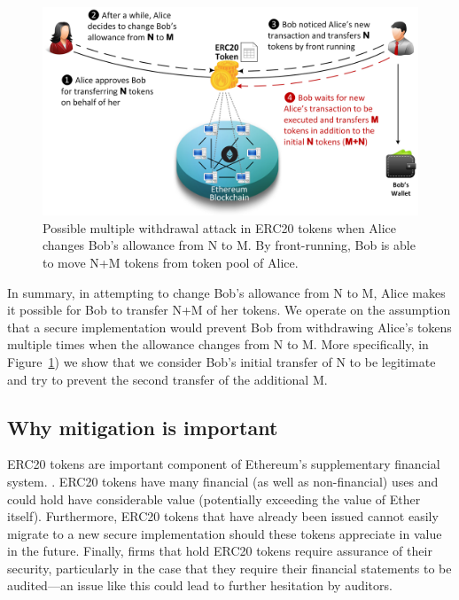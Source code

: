 \begin{figure}[ht]
	\centering
	\includegraphics[width=1.0\linewidth]{figures/multiple_withdrawal_02.png}
	\caption{Possible multiple withdrawal attack in ERC20 tokens when Alice changes Bob's allowance from N to M. By front-running, Bob is able to move N+M tokens from token pool of Alice.\label{fig:mwa}}
\end{figure}

In summary, in attempting to change Bob's allowance from N to M, Alice makes it possible for Bob to transfer N+M of her tokens. We operate on the assumption that a secure implementation would prevent Bob from withdrawing Alice's tokens multiple times when the allowance changes from N to M. More specifically, in Figure~\ref{fig:mwa}) we show that we consider Bob's initial transfer of N to be legitimate and try to prevent the second transfer of the additional M.

\subsection{Why mitigation is important}

ERC20 tokens are important component of Ethereum's supplementary financial system. . ERC20 tokens have many financial (as well as non-financial) uses and could hold have considerable value (potentially exceeding the value of Ether itself). Furthermore, ERC20 tokens that have already been issued cannot easily migrate to a new secure implementation should these tokens appreciate in value in the future. Finally, firms that hold ERC20 tokens require assurance of their security, particularly in the case that they require their financial statements to be audited---an issue like this could lead to further hesitation by auditors.

